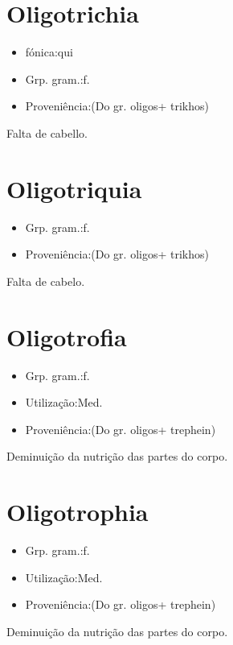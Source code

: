 \section{Oligotrichia}
\begin{itemize}
\item {fónica:qui}
\end{itemize}
\begin{itemize}
\item {Grp. gram.:f.}
\end{itemize}
\begin{itemize}
\item {Proveniência:(Do gr. \textunderscore oligos\textunderscore  + \textunderscore trikhos\textunderscore )}
\end{itemize}
Falta de cabello.
\section{Oligotriquia}
\begin{itemize}
\item {Grp. gram.:f.}
\end{itemize}
\begin{itemize}
\item {Proveniência:(Do gr. \textunderscore oligos\textunderscore  + \textunderscore trikhos\textunderscore )}
\end{itemize}
Falta de cabelo.
\section{Oligotrofia}
\begin{itemize}
\item {Grp. gram.:f.}
\end{itemize}
\begin{itemize}
\item {Utilização:Med.}
\end{itemize}
\begin{itemize}
\item {Proveniência:(Do gr. \textunderscore oligos\textunderscore  + \textunderscore trephein\textunderscore )}
\end{itemize}
Deminuição da nutrição das partes do corpo.
\section{Oligotrophia}
\begin{itemize}
\item {Grp. gram.:f.}
\end{itemize}
\begin{itemize}
\item {Utilização:Med.}
\end{itemize}
\begin{itemize}
\item {Proveniência:(Do gr. \textunderscore oligos\textunderscore  + \textunderscore trephein\textunderscore )}
\end{itemize}
Deminuição da nutrição das partes do corpo.
